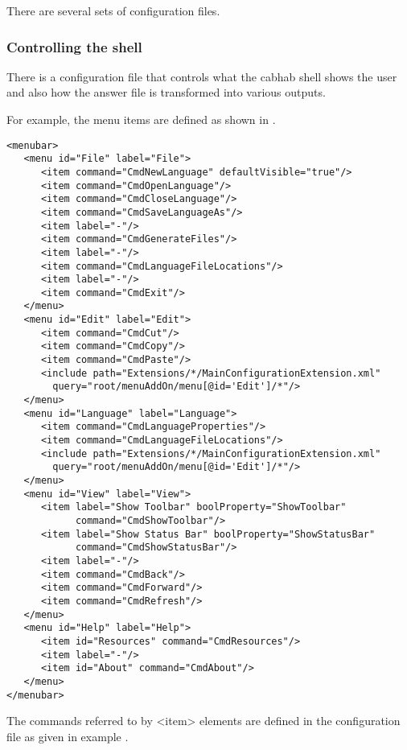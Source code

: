 There are several sets of configuration files. 

\subsubsection{Controlling the shell}\label{sConfigCabhab}
There is a configuration file that controls what the {cabhab} shell shows the user and also how the answer file is transformed into various outputs.

For example, the menu items are defined as shown in .

\ea  \label{xConfigMenuItems}%
\begin{verbatim}
<menubar>
   <menu id="File" label="File">
      <item command="CmdNewLanguage" defaultVisible="true"/>
      <item command="CmdOpenLanguage"/>
      <item command="CmdCloseLanguage"/>
      <item command="CmdSaveLanguageAs"/>
      <item label="-"/>
      <item command="CmdGenerateFiles"/>
      <item label="-"/>
      <item command="CmdLanguageFileLocations"/>
      <item label="-"/>
      <item command="CmdExit"/>
   </menu>
   <menu id="Edit" label="Edit">
      <item command="CmdCut"/>
      <item command="CmdCopy"/>
      <item command="CmdPaste"/>
      <include path="Extensions/*/MainConfigurationExtension.xml" 
        query="root/menuAddOn/menu[@id='Edit']/*"/>
   </menu>
   <menu id="Language" label="Language">
      <item command="CmdLanguageProperties"/>
      <item command="CmdLanguageFileLocations"/>
      <include path="Extensions/*/MainConfigurationExtension.xml" 
        query="root/menuAddOn/menu[@id='Edit']/*"/>
   </menu>
   <menu id="View" label="View">
      <item label="Show Toolbar" boolProperty="ShowToolbar" 
            command="CmdShowToolbar"/>
      <item label="Show Status Bar" boolProperty="ShowStatusBar"
            command="CmdShowStatusBar"/>
      <item label="-"/>
      <item command="CmdBack"/>
      <item command="CmdForward"/>
      <item command="CmdRefresh"/>
   </menu>
   <menu id="Help" label="Help">
      <item id="Resources" command="CmdResources"/>
      <item label="-"/>
      <item id="About" command="CmdAbout"/>
   </menu>
</menubar>
\end{verbatim}
\z

 The commands referred to by <item> elements are defined in the configuration file as given in example .


